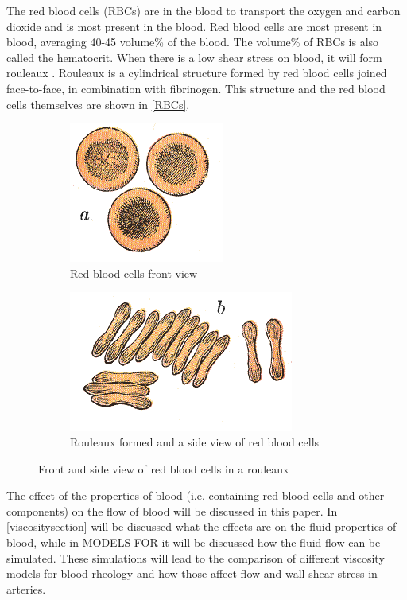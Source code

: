 The red blood cells (RBCs) are in the blood to transport the oxygen and carbon dioxide and is most present in the blood. Red blood cells are most present in blood, averaging 40-45 volume\% of the blood. The volume\% of RBCs is also called the hematocrit. When there is a low shear stress on blood, it will form rouleaux \cite{merill}. Rouleaux is a cylindrical structure formed by red blood cells joined face-to-face, in combination with fibrinogen. This structure and the red blood cells themselves are shown in \autoref{RBCs}.
\begin{figure}[b]
\centering
	\begin{subfigure}[b]{0.4 \textwidth}
	\includegraphics[scale = 0.75]{gray-a.png}
	\caption{Red blood cells front view \cite{GRAY}}
	\label{rbcfront}
	\end{subfigure}
	\begin{subfigure}[b]{0.55 \textwidth}
	\includegraphics[scale = 0.75]{gray-b.png}
	\caption{Rouleaux formed and a side view of red blood cells \cite{GRAY}}
	\label{rouleaux}
	\end{subfigure}
\caption{Front and side view of red blood cells in a rouleaux}
\label{RBCs}
\end{figure}
The effect of the properties of blood (i.e. containing red blood cells and other components) on the flow of blood will be discussed in this paper. In \autoref{viscositysection} will be discussed what the effects are on the fluid properties of blood, while in MODELS FOR it will be discussed how the fluid flow can be simulated. These simulations will lead to the comparison of different viscosity models for blood rheology and how those affect flow and wall shear stress in arteries. 
